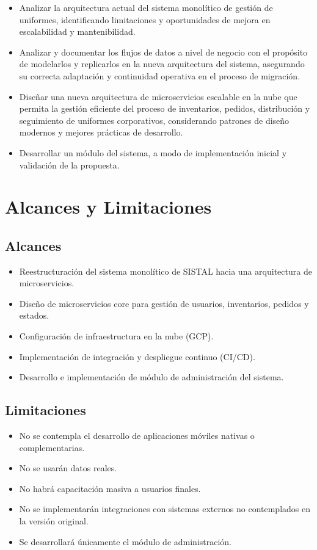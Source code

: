 \begin{itemize}
    \item Analizar la arquitectura actual del sistema monolítico de gestión de uniformes, identificando limitaciones y oportunidades de mejora en escalabilidad y mantenibilidad.
    \item Analizar y documentar los flujos de datos a nivel de negocio con el propósito de modelarlos y replicarlos en la nueva arquitectura del sistema, asegurando su correcta adaptación y continuidad operativa en el proceso de migración.
    \item Diseñar una nueva arquitectura de microservicios escalable en la nube que permita la gestión eficiente del proceso de inventarios, pedidos, distribución y seguimiento de uniformes corporativos, considerando patrones de diseño modernos y mejores prácticas de desarrollo.
    \item Desarrollar un módulo del sistema, a modo de implementación inicial y validación de la propuesta.
\end{itemize}


\section{Alcances y Limitaciones}

\subsection{Alcances}

\begin{itemize}
    \item Reestructuración del sistema monolítico de SISTAL hacia una arquitectura de microservicios.
    \item Diseño de microservicios core para gestión de usuarios, inventarios, pedidos y estados.
    \item Configuración de infraestructura en la nube (GCP).
    \item Implementación de integración y despliegue continuo (CI/CD).
    \item Desarrollo e implementación de módulo de administración del sistema.
\end{itemize}

\subsection{Limitaciones}

\begin{itemize}
    \item No se contempla el desarrollo de aplicaciones móviles nativas o complementarias.
    \item No se usarán datos reales.
    \item No habrá capacitación masiva a usuarios finales.
    \item No se implementarán integraciones con sistemas externos no contemplados en la versión original.
    \item Se desarrollará únicamente el módulo de administración.
\end{itemize}


